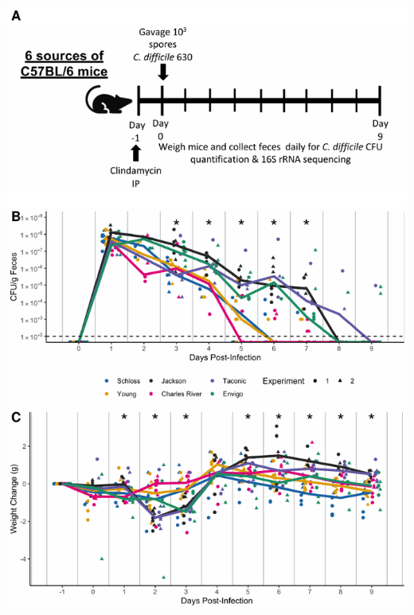 \documentclass[
  11pt,
]{article}
\begin{document}
\newpage

\includegraphics{figure_2.pdf}
\end{document}
